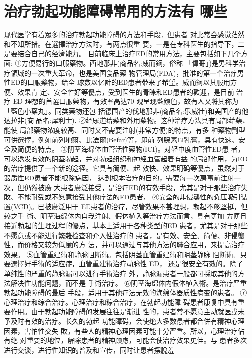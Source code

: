 \documentclass[12pt,UTF8]{ctexbook}
\begin{document}
\section{治疗勃起功能障碍常用的方法有
哪些}
现代医学有着眾多的治疗勃起功能障碍的方法和手段，但患者
对此常会感觉茫然和不知所措。在選擇治疗方法时，有两点很重
要，一是在专科医生的指导下，二是要结合自己的经濟能力。
目前临床上治疗ED的常用方法，主要包括如下几个方面:
①方便易行的口服藥物。西地那非(商品名:威而鋼，俗称
「偉哥」)是男科学治疗領域的一次重大革命，也是美国食品藥
物管理局(FDA)，批准的第一个治疗男性ED的口服藥物，给全
球数以亿計的ED患者带来了希望。威而鋼以其服用方便、效果肯
定、安全性好等優点，受到医生的青睐和ED患者的歡迎，是目前
治疗 ED 理想的首選口服藥物，有效率高达70%
观呈现藍颜色，故有人又将其称为「藍色小藥丸」。同类藥物还包
括德国产的伐地那非(商品名:乐威壮)和美国产的他达拉非(商
品名:犀利士).
②经尿道给藥和外用藥物。这种治疗方法具有局部给藥、能使
局部藥物浓度较高、同时又不需要注射(非常方便)的特点，有多
种藥物劑型可供選擇，例如前列地爾、比法爾(Befar)等，即前
列腺素El乳膏，具有快速、安全及简便的特点。
③阴茎海绵体血管活性藥物(ICI)。对轻中度血管性ED患
者，可以诱发有效的阴茎勃起，并对勃起组织和神经血管起着有益
的局部作用，为ED的治疗提供了一个新的途径。它具有简便、起
效快、效果明确等優点，虽然对于器质性ED患者不能根除病因，
达到根本治疗的目的，需要每一次房事前注射一次，但仍然被廣
大患者廣泛接受，是治疗ED的有效手段，尤其是对于那些治疗失
敗、不能耐受或不愿意接受其他疗法的ED患者。
④安全的非侵襲性的负压吸引装置(VCD)。已被廣泛用于
ED患者的治疗，尽管效果不甚理想，勃起不够堅挺，但较之手
術、阴茎海绵体内自我注射、假体植入等治疗方法而言，具有更加
方便且接近勃起的生理过程的優点，基本上适用于各种类型的ED
患者，尤其是对于那些不愿意或不能进行繁雜检查和介入性治疗的
患者，是有效、安全、简便、非侵襲性，而价格又较为低廉的方
法，并可以通过与其他方法的聯合应用，来提高治疗效果。
⑤血管重建術和静脉阻断術。包括阴茎血管重建術和阴茎静脉
阻断術。只要選擇好手術的适应症，血管重建術治疗动脉性 ED，
还是很安全有效的。除了单纯性的严重的静脉漏可以进行手術治疗
外，静脉漏患者一般都可採取其他的方法解决性功能问题，而不是
手術治疗。
⑥阴茎海绵体内假体植入術。是治疗严重勃起功能障碍的最后
手段，适用于其他疗法无效的海绵体器质性病变的患者。
⑦心理治疗和综合治疗。心理治疗和粽合治疗，在勃起功能障
碍患者康复中具有重要作用。由于勃起功能障碍的发展往往是渐进
性的，患者常不愿意主动就医或未予及时有效的治疗。长久的勃起
功能障碍，会使绝大多数患者都合併有精神心理因素，害怕性交失
敗，有些人的精神心理因素可能十分严重。所以，心理治疗佔有绝
对重要的地位，解除患者的精神顾虑，可能会使治疗效果更佳。与
患者多次进行交谈，进行性知识的普及和宣传，同时让患者摆脫羞
\end{document}
